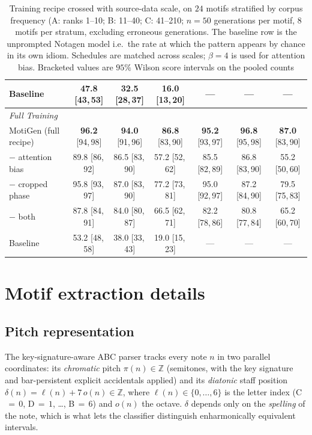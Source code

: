 \documentclass{article}
\newcommand{\method}{MotiGen}
\begin{document}
\begin{table}[h]
\begin{tabular}{lcccccc}
    \quad Baseline               & 47.8 {\tiny[43,\,53]} & 32.5 {\tiny[28,\,37]} & 16.0 {\tiny[13,\,20]} & --- & --- & --- \\
    \midrule
    \multicolumn{7}{l}{\emph{Full Training}} \\
    \method{} (full recipe)      & \textbf{96.2} {\tiny[94,\,98]} & \textbf{94.0} {\tiny[91,\,96]} & \textbf{86.8} {\tiny[83,\,90]} & \textbf{95.2} {\tiny[93,\,97]} & \textbf{96.8} {\tiny[95,\,98]} & \textbf{87.0} {\tiny[83,\,90]} \\
    \quad $-$ attention bias     & 89.8 {\tiny[86,\,92]} & 86.5 {\tiny[83,\,90]} & 57.2 {\tiny[52,\,62]} & 85.5 {\tiny[82,\,89]} & 86.8 {\tiny[83,\,90]} & 55.2 {\tiny[50,\,60]} \\
    \quad $-$ cropped phase      & 95.8 {\tiny[93,\,97]} & 87.0 {\tiny[83,\,90]} & 77.2 {\tiny[73,\,81]} & 95.0 {\tiny[92,\,97]} & 87.2 {\tiny[84,\,90]} & 79.5 {\tiny[75,\,83]} \\
    \quad $-$ both               & 87.8 {\tiny[84,\,91]} & 84.0 {\tiny[80,\,87]} & 66.5 {\tiny[62,\,71]} & 82.2 {\tiny[78,\,86]} & 80.8 {\tiny[77,\,84]} & 65.2 {\tiny[60,\,70]} \\
    \quad Baseline               & 53.2 {\tiny[48,\,58]} & 38.0 {\tiny[33,\,43]} & 19.0 {\tiny[15,\,23]} & --- & --- & --- \\
    \bottomrule
  \end{tabular} 
  \caption{Training recipe crossed with source-data scale, on $24$ motifs
  stratified by corpus frequency (A: ranks 1--10; B: 11--40; C: 41--210;
  $n{=}50$ generations per motif, $8$ motifs per stratum, excluding erroneous generations. The baseline row is the unprompted Notagen model i.e.\ the rate at which the pattern appears by chance in its own idiom. Schedules are matched across scales; $\beta{=}4$ is used for attention bias. Bracketed values are $95\%$ Wilson score intervals on the pooled counts}
  \label{tab:scaling}
\end{table}

\section{Motif extraction details}
\label{app:extraction}

\subsection*{Pitch representation}
The key-signature-aware ABC parser tracks every note $n$ in two parallel coordinates: its \emph{chromatic} pitch $\pi(n) \in \mathbb{Z}$ (semitones, with the key signature and bar-persistent explicit accidentals applied) and its \emph{diatonic} staff position $\delta(n) = \ell(n) + 7\,o(n) \in \mathbb{Z}$, where $\ell(n) \in \{0,\dots,6\}$ is the letter index (C$\,{=}\,0$, D$\,{=}\,1$, \dots, B$\,{=}\,6$) and $o(n)$ the octave. $\delta$ depends only on the \emph{spelling} of the note, which is what lets the classifier distinguish enharmonically equivalent intervals.
\end{document}
